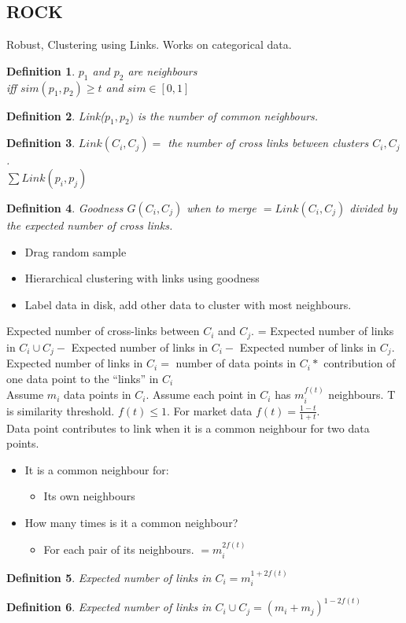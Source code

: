 \documentclass[a4paper]{article}
\newtheorem{definition}{Definition}
\begin{document}
\subsection{ROCK}
Robust, Clustering using Links. Works on categorical data.\\
\begin{definition}
	$p_1$ and $p_2$ are neighbours\\
	iff $sim(p_1,p_2)\geq t $ and $sim\in[0,1]$
\end{definition}
\begin{definition}
	Link($p_1,p_2)$ is the number of common neighbours.
\end{definition}
\begin{definition}
	$Link(C_i,C_j)=$ the number of cross links between clusters $C_i,
	C_j$.\\
	$\sum Link(p_i,p_j)$
\end{definition}
\begin{definition}
	Goodness $G(C_i,C_j)$ when to merge $= Link(C_i,C_j)$ divided by the
	expected number of cross links.
\end{definition}
\begin{itemize}
\item	Drag random sample
\item Hierarchical clustering with links using goodness
\item Label data in disk, add other data to cluster with most neighbours.
\end{itemize}
Expected number of cross-links between $C_i$ and $C_j$.	= Expected number of
links in $C_i\cup C_j - $ Expected number of links in $C_i -$ Expected number of
links in
$C_j$.\\
Expected number of links in $C_i =$ number of data points in $C_i *$
contribution of one data point to the ``links'' in $C_i$\\
Assume $m_i$ data points in $C_i$. Assume each point in $C_i$ has $m_i^{f(t)}$
neighbours. T is similarity threshold. $f(t)\leq 1$. For market data
$f(t)=\frac{1-t}{1+t}$.\\
Data point contributes to link when it is a common neighbour for two data
points.
\begin{itemize}
	\item It is a common neighbour for:
		\begin{itemize}
			\item Its own neighbours
		\end{itemize}
	\item How many times is it a common neighbour?
		\begin{itemize}
			\item For each pair of its neighbours. $=m_i^{2f(t)}$
		\end{itemize}
\end{itemize}
\begin{definition}
	Expected number of links in $C_i = m_i^{1+2f(t)}$
\end{definition}
\begin{definition}
	Expected number of links in $C_i\cup C_j = (m_i+m_j)^{1-2f(t)}$
\end{definition}
\end{document}
